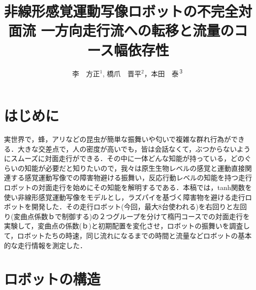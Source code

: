 \documentclass[twocolumn]{jarticle} %
\title{%
非線形感覚運動写像ロボットの不完全対面流
一方向走行流への転移と流量のコース幅依存性
}
\author{%
李　方正$^1$, 橋爪　晋平$^2$，本田　泰$^３$
}
\affiliation{%
$^1$ 室蘭工業大学大学院　工学研究科　情報電子工学系専攻\\
$^2$ 室蘭工業大学　工学部　情報電子工学系学科\\
$^3$ 室蘭工業大学大学院　しくみ解明系領域
}
\begin{document}
\maketitle

\section{はじめに}
実世界で，蜂，アリなどの昆虫が簡単な振舞いや匂いで複雑な群れ行為ができる．大きな交差点で，人の密度が高いでも，皆は会話なくて，ぶつからないようにスムーズに対面走行ができる．その中に一体どんな知能が持っている，どのぐらいの知能が必要だと知りたいので，我々は原生生物レベルの感覚と運動直接関連する感覚運動写像での障害物避ける振舞い，反応行動レベルの知能を持つ走行ロボットの対面走行を始めにその知能を解明するである．本稿では，tanh関数を使い非線形感覚運動写像をモデルとし，ラズパイを基づく障害物を避ける走行ロボットを開発した．その走行ロボット(今回，最大8台使われる)を右回りと左回り(変曲点係数ｂで制御する)の２つグループを分けて楕円コースでの対面走行を実験して，変曲点の係数(ｂ)と初期配置を変化させ，ロボットの振舞いを調査して，ロボットたちの時速，同じ流れになるまでの時間と流量などロボットの基本的な走行情報を測定した．
\section{ロボットの構造}
\end{document}
